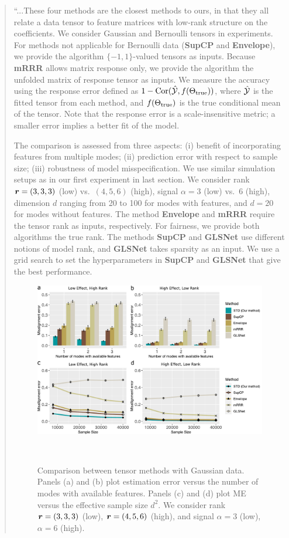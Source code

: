 \documentclass[11pt]{article}
\theoremstyle{plain}
\theoremstyle{definition}
\begin{document}
\begin{enumerate}[wide, labelwidth=!, labelindent=0pt]
\begin{enumerate}[wide, labelwidth=!, labelindent=0pt]
\begin{quote}
            ``...These four methods are the closest methods to ours, in that they all relate a data tensor to feature matrices with low-rank structure on the coefficients. We consider Gaussian and Bernoulli tensors in experiments. For methods not applicable for Bernoulli data ({\bf SupCP} and {\bf Envelope}), we provide the algorithm $\{-1,1\}$-valued tensors as inputs. Because {\bf mRRR} allows matrix response only, we provide the algorithm the unfolded matrix of response tensor as inputs. We measure the accuracy using the response error defined as $1-\text{Cor}(\hat {\mathcal{Y}}, f(\Theta_{\textup{true}}))$, where $\hat {\mathcal{Y}}$ is the fitted tensor from each method, and $f(\Theta_{\textup{true}})$ is the true conditional mean of the tensor. Note that the response error is a scale-insensitive metric; a smaller error implies a better fit of the model.

The comparison is assessed from three aspects: (i) benefit of incorporating features from multiple modes; (ii) prediction error with respect to sample size; (iii) robustness of model misspecification. We use similar simulation setups as in our first experiment in last section. We consider rank $\bm{r}=(3,3,3)$ (low) vs.\ $(4,5,6)$ (high), signal $\alpha = 3$ (low) vs.\ $6$ (high), dimension $d$ ranging from 20 to 100 for modes with features, and $d = 20$ for modes without features. The method \textbf{Envelope} and \textbf{mRRR} require the tensor rank as inputs, respectively. For fairness, we provide both algorithms the true rank. The methods \textbf{SupCP} and \textbf{GLSNet} use different notions of model rank, and \textbf{GLSNet} takes sparsity as an input. We use a grid search to set the hyperparameters in \textbf{SupCP} and \textbf{GLSNet} that give the best performance.

\begin{figure}[H]
\centering
\includegraphics[width=12cm]{comp_final_normal.pdf} 
\caption{Comparison between tensor methods with Gaussian data. Panels (a) and (b) plot estimation error versus the number of modes with available features. Panels (c) and (d) plot ME versus the effective sample size $d^2$.
We consider rank $\bm{r}=(3,3,3)$ (low), $\bm{r}=(4,5,6)$ (high), and signal $\alpha =3 $ (low), $\alpha=6$ (high).}~\label{fig:comp}
\end{figure}


\end{quote}
\end{enumerate}
\end{enumerate}
\end{document}
